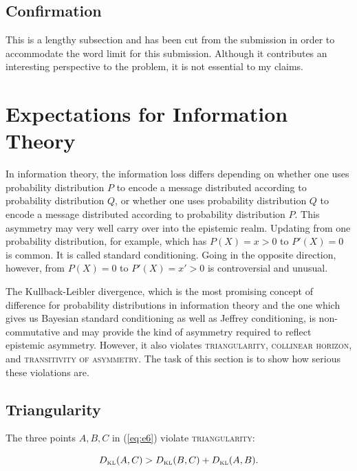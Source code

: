 \documentclass[11pt]{article}
\begin{document}
\subsection{Confirmation}
\label{Confirmation}

This is a lengthy subsection and has been cut from the submission in
order to accommodate the word limit for this submission. Although it
contributes an interesting perspective to the problem, it is not
essential to my claims.

\section{Expectations for Information Theory}
\label{sec:expinfth}

In information theory, the information loss differs depending on
whether one uses probability distribution $P$ to encode a message
distributed according to probability distribution $Q$, or whether one
uses probability distribution $Q$ to encode a message distributed
according to probability distribution $P$. This asymmetry may very
well carry over into the epistemic realm. Updating from one
probability distribution, for example, which has $P(X)=x>0$ to
$P'(X)=0$ is common. It is called standard conditioning. Going in the
opposite direction, however, from $P(X)=0$ to $P'(X)=x'>0$ is
controversial and unusual.

The Kullback-Leibler divergence, which is the most promising concept
of difference for probability distributions in information theory and
the one which gives us Bayesian standard conditioning as well as
Jeffrey conditioning, is non-commutative and may provide the kind of
asymmetry required to reflect epistemic asymmetry. However, it also
violates \textsc{triangularity}, \textsc{collinear horizon}, and
\textsc{transitivity of asymmetry}. The task of this section is to
show how serious these violations are.

\subsection{Triangularity}
\label{subsec:triangularity}

The three points $A,B,C$ in (\ref{eq:e6}) violate
\textsc{triangularity}:

\begin{equation}
  \label{eq:yohliimo}
  D_{\mbox{\tiny KL}}(A,C)>D_{\mbox{\tiny KL}}(B,C)+D_{\mbox{\tiny KL}}(A,B).
\end{equation}
\end{document}
